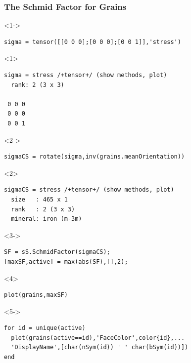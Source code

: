 \documentclass[compress]{beamer}
\begin{document}
\begin{frame}[fragile]
  \frametitle{The Schmid Factor for Grains}
  \vspace{-0.5cm}
  \begin{overlayarea}{\textwidth}{\textheight}
    \begin{onlyenv}<1->
\begin{lstlisting}[style=input]
sigma = tensor([[0 0 0];[0 0 0];[0 0 1]],'stress')
\end{lstlisting}
  \end{onlyenv}
  \begin{onlyenv}<1>
\begin{lstlisting}[style=output]
sigma = stress /+tensor+/ (show methods, plot)
  rank: 2 (3 x 3)

 0 0 0
 0 0 0
 0 0 1
\end{lstlisting}
    \end{onlyenv}
    \vspace{-0.3cm}
    \begin{onlyenv}<2->
\begin{lstlisting}[style=input]
sigmaCS = rotate(sigma,inv(grains.meanOrientation))
\end{lstlisting}
    \end{onlyenv}
    \begin{onlyenv}<2>
\begin{lstlisting}[style=output]
sigmaCS = stress /+tensor+/ (show methods, plot)
  size   : 465 x 1
  rank   : 2 (3 x 3)
  mineral: iron (m-3m)
\end{lstlisting}
    \end{onlyenv}
    \begin{onlyenv}<3->
      \vspace{-0.3cm}
      \begin{lstlisting}[style=input]
SF = sS.SchmidFactor(sigmaCS);
[maxSF,active] = max(abs(SF),[],2);
\end{lstlisting}
    \end{onlyenv}
    \begin{onlyenv}<4>
      \vspace{-0.3cm}
\begin{lstlisting}[style=input]
plot(grains,maxSF)
\end{lstlisting}
    \end{onlyenv}
    \begin{onlyenv}<5->
      \vspace{-0.3cm}
\begin{lstlisting}[style=input]
for id = unique(active)
  plot(grains(active==id),'FaceColor',color{id},...
  'DisplayName',[char(nSym(id)) ' ' char(bSym(id))])
end
\end{lstlisting}


\end{onlyenv}
\end{overlayarea}
\end{frame}
\end{document}
